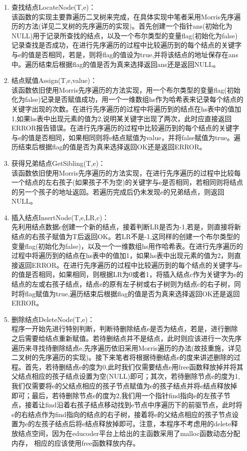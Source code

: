 \documentclass[supercite]{Experimental_Report}
\theoremstyle{definition}
\begin{document}
\begin{enumerate}
    \item 查找结点LocateNode(T,e)：\\该函数的实现主要靠遍历二叉树来完成，在具体实现中笔者采用Morris先序遍历的方法(详见二叉树的先序遍历的实现)。首先创建一个指针ans(初始化为NULL)用于记录所查找的结点，以及一个布尔类型的变量flag(初始化为false)记录查找是否成功，在进行先序遍历的过程中比较遍历到的每个结点的关键字与e的值是否相同，若是，则将flag的值设为true,并将该结点的地址保存在ans中。遍历结束后根据flag的值是否为真来选择返回ans还是返回NULL。
    \item 结点赋值Assign(T,e,value)：\\该函数依旧使用Morris先序遍历的方法实现，用一个布尔类型的变量flag(初始化为false)记录是否赋值成功，用一个一维数组hs作为哈希表来记录每个结点的关键字出现的次数。在进行先序遍历的过程中将遍历到的结点在hs表中的值加1,如果hs表中出现元素的值为2,说明某关键字出现了两次，此时应直接返回ERROR报告错误。在进行先序遍历的过程中比较遍历到的每个结点的关键字与e的值是否相同，如果相同则将e结点赋值为value，并将false赋值为true。遍历结束后根据flag的值是否为真来选择返回OK还是返回ERROR。
    \item 获得兄弟结点GetSibling(T,e)：\\该函数依旧使用Morris先序遍历的方法实现，在进行先序遍历的过程中比较每一个结点的左右孩子(如果孩子不为空)的关键字与e是否相同，若相同则将结点的另一个孩子的地址返回。若遍历完成后仍未发现e的兄弟结点，则返回NULL。
    \item 插入结点InsertNode(T,e,LR,c)：\\先利用结点数据c创建一个新的结点，接着判断LR是否为-1,若是，则直接将新结点的右孩子赋值为T后返回OK。若LR不是-1,这同样的创建一个布尔类型的变量flag(初始化为false)，以及一个一维数组hs用作哈希表。在进行先序遍历的过程中将遍历到的结点在hs表中的值加1，如果hs表中出现元素的值为2，则直接返回ERROR。在进行先序遍历的过程中比较遍历到的每个结点的关键字与e的值是否相同，如果相同，则根据LR为0或者1，将插入结点c作为关键字为e的结点的左或右孩子结点，结点e的原有左子树或右子树则为结点c的右子树，同时将flag赋值为true,遍历结束后根据flag的值是否为真来选择返回OK还是返回ERROR。
    \item 删除结点DeleteNode(T,e)：\\程序一开始先进行特别判断，判断待删除结点e是否为结点，若是，进行删除之后需要给结点重新赋值。若待删结点并不是结点，此时则应该进行一次先序遍历来寻找待删除结点e,先序遍历依旧采用Morris遍历的办法(故技重施，详见二叉树的先序遍历的实现)。接下来笔者将根据待删结点e的度来讲述删除的过程。首先，若待删结点e的度为0,此时我们仅需要结点e用free函数释放掉并将其父结点相应的孩子结点设置为空(NULL)即可；其次，若待删除节点e的度为1,我们仅需要将e的父结点相应的孩子节点赋值为e的孩子结点并将e结点释放掉即可；最后，若待删除节点e的度为2,我们用一个指针find指向e的左孩子节点，接着让find沿着右孩子结点移动找到e节点中序遍历下的前驱节点，此时将e的右结点作为find指向的结点的右子树，接着将e的父结点相应的孩子节点设置为e的左孩子结点后将e结点释放掉即可。注意，本程序不考虑用的delete释放结点空间，因为在educoder平台上给出的主函数采用了malloc函数动态分配内存， 相应的应该使用free函数释放内存。

\end{enumerate}
\end{document}
